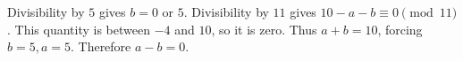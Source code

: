 Divisibility by $5$ gives $b=0$ or $5$. Divisibility by $11$ gives $10-a-b\equiv0\pmod{11}$. This quantity is between $-4$ and $10$, so it is zero. Thus $a+b=10$, forcing $b=5,a=5$. Therefore $a-b=\boxed0$.

